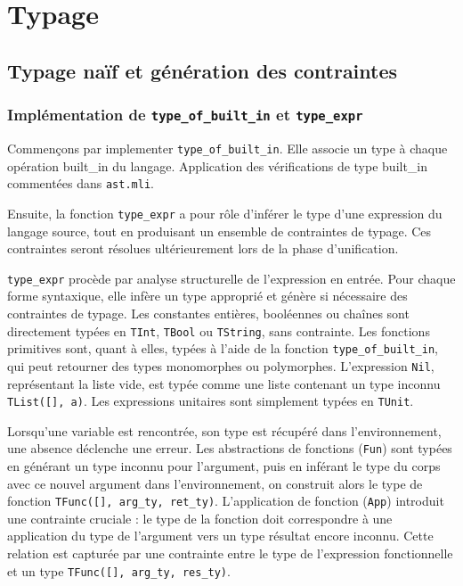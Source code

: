 \section{Typage}

\subsection{Typage naïf et génération des contraintes}

\subsubsection{Implémentation de \texttt{type\_of\_built\_in} et \texttt{type\_expr}}

Commençons par implementer \texttt{type\_of\_built\_in}. Elle associe un type à chaque opération built\_in du langage.
Application des vérifications de type built\_in commentées dans \texttt{ast.mli}.

Ensuite, la fonction \texttt{type\_expr} a pour rôle d'inférer le type d'une expression du langage source, tout en produisant un ensemble de contraintes de typage.
Ces contraintes seront résolues ultérieurement lors de la phase d'unification.

\texttt{type\_expr} procède par analyse structurelle de l'expression en entrée. Pour chaque forme syntaxique, elle infère un type approprié et génère si nécessaire des contraintes de typage. 
Les constantes entières, booléennes ou chaînes sont directement typées en \texttt{TInt}, \texttt{TBool} ou \texttt{TString}, sans contrainte. Les fonctions primitives sont, quant à elles, typées à l'aide de la fonction \texttt{type\_of\_built\_in}, qui peut retourner des types monomorphes ou polymorphes. 
L'expression \texttt{Nil}, représentant la liste vide, est typée comme une liste contenant un type inconnu \texttt{TList([], a)}. Les expressions unitaires sont simplement typées en \texttt{TUnit}. 

Lorsqu'une variable est rencontrée, son type est récupéré dans l'environnement, une absence déclenche une erreur. Les abstractions de fonctions (\texttt{Fun}) sont typées en générant un type inconnu pour l'argument, puis en inférant le type du corps avec ce nouvel argument dans l’environnement, on construit alors le type de fonction \texttt{TFunc([], arg\_ty, ret\_ty)}.
L'application de fonction (\texttt{App}) introduit une contrainte cruciale : le type de la fonction doit correspondre à une application du type de l'argument vers un type résultat encore inconnu.
Cette relation est capturée par une contrainte entre le type de l'expression fonctionnelle et un type \texttt{TFunc([], arg\_ty, res\_ty)}.

